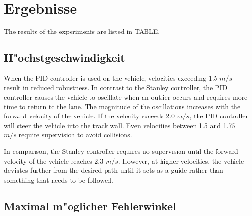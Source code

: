 \documentclass[arbeit=studie,oneside,BCOR=12mm]{ArbeitRST}
\begin{document}
\section{Ergebnisse}

The results of the experiments are listed in TABLE. 

\subsection{H"ochstgeschwindigkeit}
When the PID controller is used on the vehicle, velocities exceeding 1.5 $m/s$
result in reduced robustness. In contrast to the Stanley controller, the PID
controller causes the vehicle to oscillate when an outlier occurs and requires
more time to return to the lane. The magnitude of the oscillations increases
with the forward velocity of the vehicle. If the velocity exceeds 2.0 $m/s$,
the PID controller will steer the vehicle into the track wall. Even velocities
between 1.5 and 1.75 $m/s$ require supervision to avoid collisions.

In comparison, the Stanley controller requires no supervision until the forward
velocity of the vehicle reaches 2.3 $m/s$. However, at higher velocities, the
vehicle deviates further from the desired path until it acts as a guide rather
than something that needs to be followed.
\iffalse
When running the PID controller on the vehicle, velocities above $1.5 \frac{m}{s}$
lead to issues with the robustness of the vehicle. In comparison to then Stanley 
controller, whenever an outlier appears, the PID controller causes the vehicle to oscillate and
requires a longer time than the Stanley controller to return to the lane. The oscillations 
scale with the forward velocity of the vehicle. With velocities greater than or equal to 
$2.0 \frac{m}{s}$, the PID controller will drive the vehicle into the wall of the track. Even 
velocities between 1.5 and 1.75 $\frac{m}{s}$ require supervision in order to make sure that the 
vehicle won't drive into the wall.

In comparsion, the Stanley controller requires no supervision, until the
forward velocity of the vehicle is above 2.3 $\frac{m}{s}$. However, at higher
velocities, the vehicle will drift farther from the path, until the vehicle
acts as a "guide", as opposed to something that needs to be followed. 
\fi

\subsection{Maximal m"oglicher Fehlerwinkel}
\end{document}
